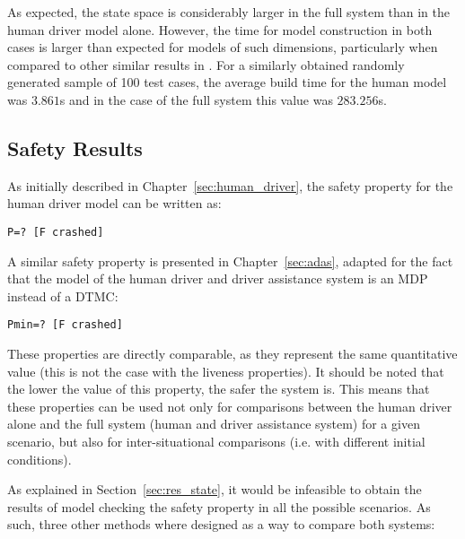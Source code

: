 As expected, the state space is considerably larger in the full system than in the human driver model alone. However, the time for model construction in both cases is larger than expected for models of such dimensions, particularly when compared to other similar results in \cite{lam}. For a similarly obtained randomly generated sample of 100 test cases, the average build time for the human model was $3.861$s and in the case of the full system this value was $283.256$s.

\subsection{Safety Results}
\label{sec:res_safety}

As initially described in Chapter~\ref{sec:human_driver}, the safety property for the human driver model can be written as:

\begin{minipage}{\linewidth}
{\vspace{1em}
\begin{lstlisting}
P=? [F crashed]
\end{lstlisting}
}
\end{minipage}

A similar safety property is presented in Chapter~\ref{sec:adas}, adapted for the fact that the model of the human driver and driver assistance system is an MDP instead of a DTMC:

\begin{minipage}{\linewidth}
{\vspace{1em}
\begin{lstlisting}
Pmin=? [F crashed]
\end{lstlisting}
}
\end{minipage}

These properties are directly comparable, as they represent the same quantitative value (this is not the case with the liveness properties). It should be noted that the lower the value of this property, the safer the system is. This means that these properties can be used not only for comparisons between the human driver alone and the full system (human and driver assistance system) for a given scenario, but also for inter-situational comparisons (i.e. with different initial conditions).

As explained in Section~\ref{sec:res_state}, it would be infeasible to obtain the results of model checking the safety property in all the possible scenarios. As such, three other methods where designed as a way to compare both systems: 

